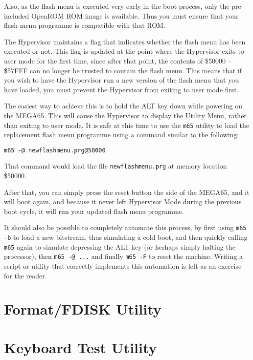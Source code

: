 Also, as the flash menu is executed very early in the boot process, only the pre-included OpenROM ROM image is available.  Thus you must ensure that your flash menu programme is compatible with that ROM.  

The Hypervisor maintains a flag that indicates whether the flash menu has been executed or not. This flag is updated at the point
where the Hypervisor exits to user mode for the first time, since after that point, the contents of \$50000 -- \$57FFF can no longer
be trusted to contain the flash menu.  This means that if you wish to have the Hypervisor run a new version of the flash menu that
you have loaded, you must prevent the Hypervisor from exiting to user mode first.

The easiest way to achieve this is to hold the ALT key down while powering on the MEGA65.  This will cause the Hypervisor to display the Utility Menu, rather than exiting to user mode.  It is safe at this time to use the {\tt m65} utility to load the replacement flash menu programme using a command similar to the following:

\begin{tcolorbox}[colback=black,coltext=white]
\verbatimfont{\codefont}
\begin{verbatim}
m65 -@ newflashmenu.prg@50000
\end{verbatim}
\end{tcolorbox}

That command would load the file {\tt newflashmenu.prg} at memory location \$50000.

After that, you can simply press the reset button the side of the MEGA65, and it will boot again, and because it never left Hypervisor Mode during the previous boot cycle, it will run your updated flash menu programme. 

It should also be possible to completely automate this process, by first using {\tt m65 -b} to load a new bitstream, thus simulating a cold boot, and then quickly calling {\tt m65} again to simulate depressing the ALT key (or herhaps simply halting the processor), then {\tt m65 -@ ...} and finally {\tt m65 -F} to reset the machine.  Writing a script or utility that correctly implements this automation is left as an exercise for the reader.

\section{Format/FDISK Utility}

\section{Keyboard Test Utility}

